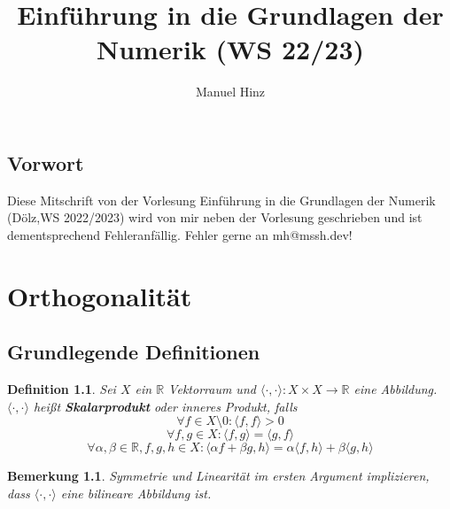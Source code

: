 \documentclass{book}
\author{Manuel Hinz}
\title{Einführung in die Grundlagen der Numerik (WS 22/23)}
\newtheorem{definition}[algorithm]{Definition}
\newtheorem{remark}[algorithm]{Bemerkung}
\def\R{\mathbb{R}}
\begin{document}
    \maketitle

    \tableofcontents

    \section*{Vorwort}

            Diese Mitschrift von der Vorlesung Einführung in die Grundlagen der Numerik (Dölz,WS 2022/2023) 
            wird von mir neben der Vorlesung geschrieben und ist dementsprechend Fehleranfällig. Fehler gerne an 
            mh@mssh.dev! 

    \chapter{Orthogonalität}

        \section{Grundlegende Definitionen}

            \begin{definition}\label{d1.1}
                Sei $X$ ein $\R$ Vektorraum und $\langle\cdot,\cdot\rangle:X\times X \to \R$ eine Abbildung. $\langle\cdot,\cdot\rangle$ heißt \textbf{Skalarprodukt} oder inneres Produkt, falls
                \begin{equation}
                    \tag{Positiviät}
                    \forall f\in X\setminus 0: \langle f,f \rangle>0
                \end{equation}
                \begin{equation}
                    \tag{Symmetrie}
                    \forall f,g\in X: \langle f,g \rangle = \langle g,f \rangle
                \end{equation}
                \begin{equation}
                    \tag{Linearität im ersten Argument}
                    \forall \alpha,\beta\in\R, f,g,h\in X: \langle \alpha f+\beta g,h \rangle
                    = \alpha \langle f,h \rangle + \beta \langle g,h \rangle
                \end{equation}
            \end{definition}

            \begin{remark}\label{b1.2}
                Symmetrie und Linearität im ersten Argument implizieren, 
                dass $\langle \cdot,\cdot  \rangle$ eine bilineare Abbildung ist. 
            \end{remark}
\end{document}
